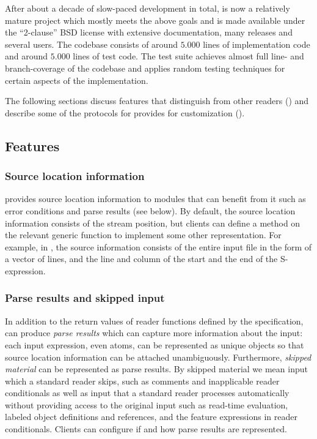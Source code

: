 After about a decade of slow-paced development in total, \eclector{}
is now a relatively mature project which mostly meets the above goals
and is made available under the ``2-clause'' BSD license with
extensive documentation, many releases and several users.  The
codebase consists of around $5.000$ lines of implementation code and
around $5.000$ lines of test code.  The test suite achieves almost
full line- and branch-coverage of the codebase and applies random
testing techniques for certain aspects of the implementation.

The following sections discuss features that distinguish \eclector{}
from other \cl{} readers () and describe some of
the protocols for \eclector{} provides for customization
().

\subsection{Features}
\label{sec:features}

\subsubsection{Source location information}
\label{sec:source-information}

\eclector{} provides source location information to modules that can
benefit from it such as error conditions and parse results (see
below).  By default, the source location information consists of the
stream position, but clients can define a method on the relevant
generic function to implement some other representation.  For example,
in \sicl{}, the source information consists of the entire input file
in the form of a vector of lines, and the line and column of the start
and the end of the S-expression.

\subsubsection{Parse results and skipped input}

In addition to the return values of reader functions defined by the
\cl{} specification, \eclector{} can produce \emph{parse results}
which can capture more information about the input: each input
expression, even atoms, can be represented as unique objects so that
source location information can be attached unambiguously.
Furthermore, \emph{skipped material} can be represented as parse
results.  By skipped material we mean input which a standard reader
skips, such as comments and inapplicable reader conditionals as well
as input that a standard reader processes automatically without
providing access to the original input such as read-time evaluation,
labeled object definitions and references, and the feature expressions
in reader conditionals.  Clients can configure if and how parse
results are represented.

